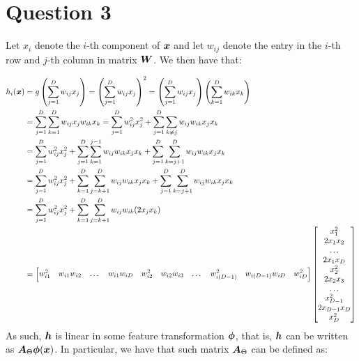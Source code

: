     \section*{Question 3}
    \begin{questions}
        \question
        Let $x_i$ denote the $i$-th component of $\vb*{x}$ and let $w_{ij}$ denote the entry in the $i$-th row and $j$-th column in matrix $\vb*{W}$. We then have that:

        \begin{align*}
            h_i(\vb*{x}) &= g\left(\sum_{j = 1}^{D} w_{ij}x_j \right) = \left(\sum_{j = 1}^{D} w_{ij}x_j \right)^2 = \left(\sum_{j = 1}^{D} w_{ij}x_j\right)\left( \sum_{k = 1}^{D} w_{ik}x_k\right) \\
            &= \sum_{j = 1}^{D} \sum_{k = 1}^{D} w_{ij}x_j  w_{ik}x_k = \sum_{j = 1}^{D} w_{ij}^2x_j^2 +  \sum_{j = 1}^{D} \sum_{k \neq j} w_{ij}w_{ik}x_j x_k \\
            &= \sum_{j = 1}^{D} w_{ij}^2x_j^2 + \sum_{j = 1}^{D} \sum_{k = 1}^{j - 1}  w_{ij}w_{ik}x_j x_k + 
            \sum_{j = 1}^{D} \sum_{k = j + 1}^{D}  w_{ij}w_{ik}x_j x_k \\
            &= \sum_{j = 1}^{D} w_{ij}^2x_j^2 +\sum_{k = 1}^{D} \sum_{j = k + 1}^{D}  w_{ij}w_{ik}x_j x_k + 
            \sum_{j = 1}^{D} \sum_{k = j + 1}^{D}  w_{ij}w_{ik}x_j x_k \\
            &= \sum_{j = 1}^{D} w_{ij}^2x_j^2 + \sum_{k = 1}^{D} \sum_{j = k + 1}^{D} w_{ij}w_{ik}(2x_j x_k) \\
            &= 
            \begin{bmatrix}
                w_{i1}^2 & w_{i1}w_{i2} & \dots & w_{i1}w_{iD} & w_{i2}^2 & w_{i2}w_{i3} & \dots & w_{i(D - 1)}^2  & w_{i(D - 1)} w_{iD} &  w_{iD}^2
            \end{bmatrix}
            \begin{bmatrix}
                x_1^2 \\ 2x_1 x_2 \\ \dots \\ 2x_1 x_D \\ x_2^2 \\ 2x_2 x_3 \\ \dots \\ x_{D - 1}^2 \\ 2x_{D - 1} x_{D} \\  x_{D}^2
            \end{bmatrix}
        \end{align*}
        As such, $\vb*{h}$ is linear in some feature transformation $\vb*{\phi}$, that is, $\vb*{h}$ can be written as $\vb*{A}_{\Theta}\vb*{\phi}(\vb*{x})$. In particular, we have that such matrix $\vb*{A}_{\Theta}$ can be defined as:

\end{questions}
